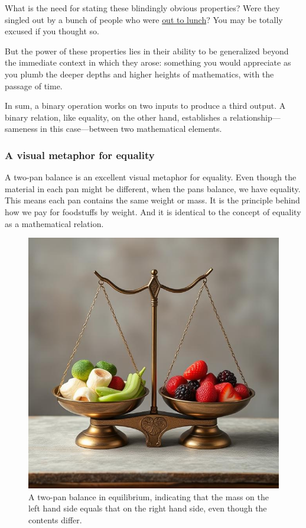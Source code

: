 \documentclass[
  a4paper,
]{article}
\begin{document}
What is the need for stating these blindingly obvious properties? Were
they singled out by a bunch of people who were
\href{https://www.dictionary.com/browse/out-to-lunch}{out to lunch}? You
may be totally excused if you thought so.

But the power of these properties lies in their ability to be
generalized beyond the immediate context in which they arose: something
you would appreciate as you plumb the deeper depths and higher heights
of mathematics, with the passage of time.

In sum, a binary operation works on two inputs to produce a third
output. A binary relation, like equality, on the other hand, establishes
a relationship---sameness in this case---between two mathematical
elements.

\subsubsection{A visual metaphor for
equality}\label{a-visual-metaphor-for-equality}

A two-pan balance is an excellent visual metaphor for equality. Even
though the material in each pan might be different, when the pans
balance, we have equality. This means each pan contains the same weight
or mass. It is the principle behind how we pay for foodstuffs by weight.
And it is identical to the concept of equality as a mathematical
relation.

\begin{figure}
\centering
\includegraphics[width=0.9\linewidth,height=\textheight,keepaspectratio]{images/two-pan-balance-in-equilibrium.jpg}
\caption{A two-pan balance in equilibrium, indicating that the mass on
the left hand side equals that on the right hand side, even though the
contents differ.}\label{fig:two-pan-balance}
\end{figure}
\end{document}

